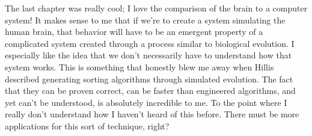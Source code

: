 \documentclass[12pt]{article}
\begin{document}
The last chapter was really cool; I love the comparison of the brain to a
computer system! It makes sense to me that if we're to create a system
simulating the human brain, that behavior will have to be an emergent property
of a complicated system created through a process similar to biological
evolution. I especially like the idea that we don't necessarily have to
understand how that system works. This is something that honestly blew me away
when Hillis described generating sorting algorithms through simulated
evolution. The fact that they can be proven correct, can be faster than
engineered algorithms, and yet can't be understood, is absolutely incredible to
me. To the point where I really don't understand how I haven't heard of this
before. There must be more applications for this sort of technique, right?
\end{document}
